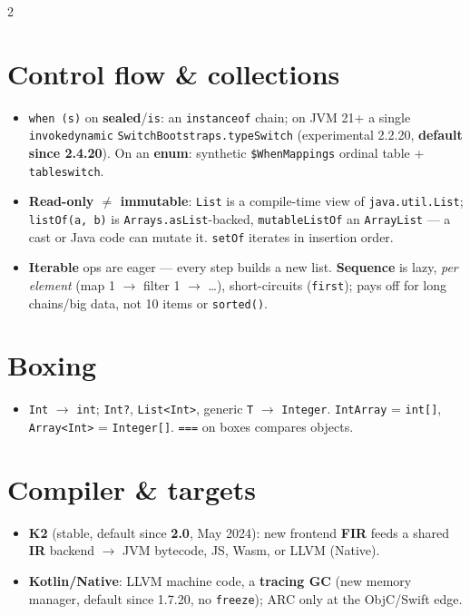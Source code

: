 \documentclass[8pt]{extarticle}
\newcommand\eqeqeq{\texttt{\hbox{=}\hbox{=}\hbox{=}}}
\begin{document}
\begin{multicols}{2}
\columnbreak

\section{Control flow \& collections}
\begin{itemize}\raggedright
  \item \texttt{when (s)} on \textbf{sealed}/\texttt{is}: an \texttt{instanceof} chain; on
        JVM 21+ a single \texttt{invokedynamic} \texttt{SwitchBootstraps.typeSwitch}
        (experimental 2.2.20, \textbf{default since 2.4.20}). On an \textbf{enum}: synthetic
        \texttt{\$WhenMappings} ordinal table + \texttt{tableswitch}\unverified.
  \item \textbf{Read-only $\neq$ immutable}: \texttt{List} is a compile-time view of
        \texttt{java.util.List}; \texttt{listOf(a, b)} is \texttt{Arrays.asList}-backed\unverified,
        \texttt{mutableListOf} an \texttt{ArrayList} — a cast or Java code can mutate it.
        \texttt{setOf} iterates in insertion order.
  \item \textbf{Iterable} ops are eager — every step builds a new list. \textbf{Sequence}
        is lazy, \emph{per element} (map 1 $\to$ filter 1 $\to$ \ldots), short-circuits
        (\texttt{first}); pays off for long chains/big data, not 10 items or \texttt{sorted()}.
\end{itemize}

\section{Boxing}
\begin{itemize}\raggedright
  \item \texttt{Int} $\to$ \texttt{int}; \texttt{Int?}, \texttt{List<Int>}, generic
        \texttt{T} $\to$ \texttt{Integer}. \texttt{IntArray} = \texttt{int[]},
        \texttt{Array<Int>} = \texttt{Integer[]}. \eqeqeq{} on boxes compares objects.
\end{itemize}

\section{Compiler \& targets}
\begin{itemize}\raggedright
  \item \textbf{K2} (stable, default since \textbf{2.0}, May 2024): new frontend \textbf{FIR}
        feeds a shared \textbf{IR} backend $\to$ JVM bytecode, JS, Wasm, or LLVM (Native).
  \item \textbf{Kotlin/Native}: LLVM machine code, a \textbf{tracing GC} (new memory
        manager, default since 1.7.20, no \texttt{freeze}); ARC only at the ObjC/Swift edge.
\end{itemize}


\end{multicols}
\end{document}

